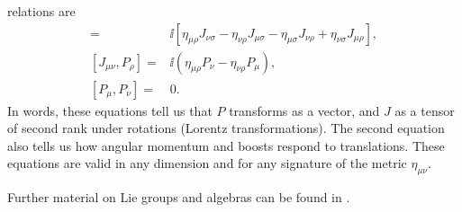 relations are
\begin{align*}
  [J_{\mu\nu},J_{\rho\sigma}]={}&\ii[\eta_{\mu\rho}J_{\nu\sigma}
    -\eta_{\nu\rho}J_{\mu\sigma}-\eta_{\mu\sigma}J_{\nu\rho}
    +\eta_{\nu\sigma}J_{\mu\rho}],\\
  [J_{\mu\nu},P_\rho]={}&\ii(\eta_{\mu\rho}P_\nu-\eta_{\nu\rho}P_\mu),\\
  [P_\mu,P_\nu]={}&0.
\end{align*}
In words, these equations tell us that $P$ transforms as a vector, and $J$ as
a tensor of second rank under rotations (Lorentz transformations). The second
equation also tells us how angular momentum and boosts respond to translations.
These equations are valid in any dimension and for any signature of the metric
$\eta_{\mu\nu}$.

Further material on Lie groups and algebras can be found in
\cite{banks-ref-1,banks-ref-2,banks-ref-3,banks-ref-4,banks-ref-5}.
